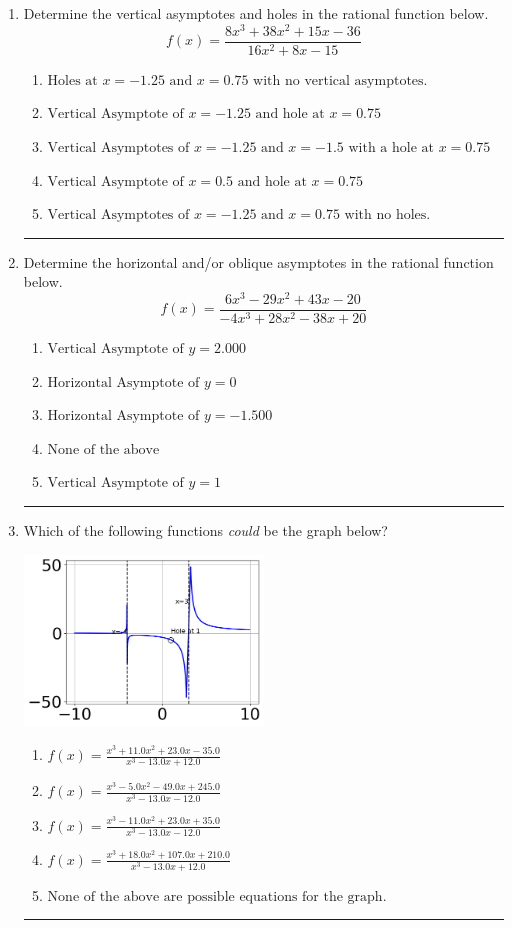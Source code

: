 \documentclass[14pt]{extbook}
\newcommand{\litem}[1]{\item#1\hspace*{-1cm}\rule{\textwidth}{0.4pt}}
\begin{document}
\begin{enumerate}
{\begin{enumerate}[label=\Alph*.]
\end{enumerate} }
\litem{
Determine the vertical asymptotes and holes in the rational function below.\[ f(x) = \frac{8x^{3} +38 x^{2} +15 x -36}{16x^{2} +8 x -15} \]\begin{enumerate}[label=\Alph*.]
\item \( \text{Holes at } x = -1.25 \text{ and } x = 0.75 \text{ with no vertical asymptotes.} \)
\item \( \text{Vertical Asymptote of } x = -1.25 \text{ and hole at } x = 0.75 \)
\item \( \text{Vertical Asymptotes of } x = -1.25 \text{ and } x = -1.5 \text{ with a hole at } x = 0.75 \)
\item \( \text{Vertical Asymptote of } x = 0.5 \text{ and hole at } x = 0.75 \)
\item \( \text{Vertical Asymptotes of } x = -1.25 \text{ and } x = 0.75 \text{ with no holes.} \)

\end{enumerate} }
\litem{
Determine the horizontal and/or oblique asymptotes in the rational function below.\[ f(x) = \frac{6x^{3} -29 x^{2} +43 x -20}{-4x^{3} +28 x^{2} -38 x + 20} \]\begin{enumerate}[label=\Alph*.]
\item \( \text{Vertical Asymptote of } y = 2.000  \)
\item \( \text{Horizontal Asymptote of } y = 0  \)
\item \( \text{Horizontal Asymptote of } y = -1.500  \)
\item \( \text{None of the above} \)
\item \( \text{Vertical Asymptote of } y = 1  \)

\end{enumerate} }
\litem{
Which of the following functions \textit{could} be the graph below?
\begin{center}
    \includegraphics[width=0.5\textwidth]{../Figures/identifyGraphOfRationalFunctionB.png}
\end{center}
\begin{enumerate}[label=\Alph*.]
\item \( f(x)=\frac{x^{3} +11.0 x^{2} +23.0 x -35.0}{x^{3} -13.0 x + 12.0} \)
\item \( f(x)=\frac{x^{3} -5.0 x^{2} -49.0 x + 245.0}{x^{3} -13.0 x -12.0} \)
\item \( f(x)=\frac{x^{3} -11.0 x^{2} +23.0 x + 35.0}{x^{3} -13.0 x -12.0} \)
\item \( f(x)=\frac{x^{3} +18.0 x^{2} +107.0 x + 210.0}{x^{3} -13.0 x + 12.0} \)
\item \( \text{None of the above are possible equations for the graph.} \)


\end{enumerate}}
\end{enumerate}
\end{document}
